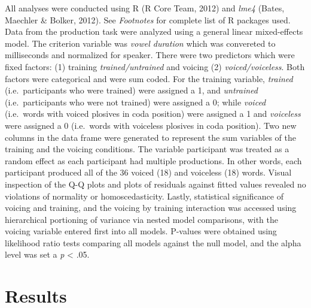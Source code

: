 \documentclass[man]{apa6}
\theoremstyle{definition}
\theoremstyle{definition}
\theoremstyle{definition}
\theoremstyle{remark}
\begin{document}
All analyses were conducted using R (R Core Team, 2012) and \emph{lme4}
(Bates, Maechler \& Bolker, 2012). See \emph{Footnotes} for complete
list of R packages used. Data from the production task were analyzed
using a general linear mixed-effects model. The criterion variable was
\emph{vowel duration} which was convereted to milliseconds and
normalized for speaker. There were two predictors which were fixed
factors: (1) training \emph{trained/untrained} and voicing (2)
\emph{voiced/voiceless}. Both factors were categorical and were sum
coded. For the training variable, \emph{trained} (i.e.~participants who
were trained) were assigned a 1, and \emph{untrained} (i.e.~participants
who were not trained) were assigned a 0; while \emph{voiced} (i.e.~words
with voiced plosives in coda position) were assigned a 1 and
\emph{voiceless} were assigned a 0 (i.e.~words with voiceless plosives
in coda position). Two new columns in the data frame were generated to
represent the sum variables of the training and the voicing conditions.
The variable participant was treated as a random effect as each
participant had multiple productions. In other words, each participant
produced all of the 36 voiced (18) and voiceless (18) words. Visual
inspection of the Q-Q plots and plots of residuals against fitted values
revealed no violations of normality or homoscedasticity. Lastly,
statistical significance of voicing and training, and the voicing by
training interaction was accessed using hierarchical portioning of
variance via nested model comparisons, with the voicing variable entered
first into all models. P-values were obtained using likelihood ratio
tests comparing all models against the null model, and the alpha level
was set a \emph{p} \textless{} .05.

\section{Results}\label{results}
\end{document}
